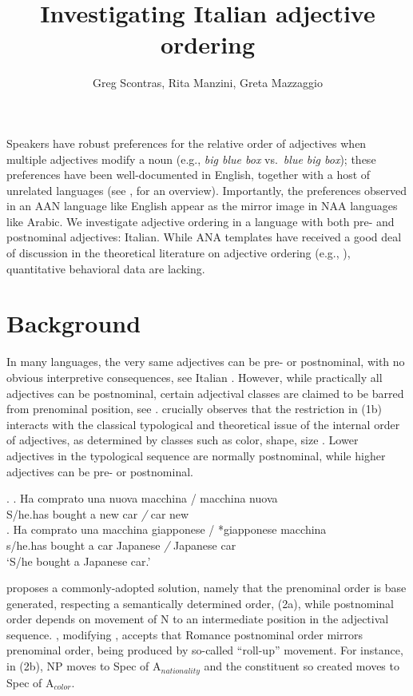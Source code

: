 \documentclass[11pt]{article}
\title{Investigating Italian adjective ordering}
\author{Greg Scontras, Rita Manzini, Greta Mazzaggio}
\begin{document}
	
\maketitle
		
		
Speakers have robust preferences for the relative order of adjectives when multiple adjectives modify a noun (e.g., \emph{big blue box} vs.~\emph{blue big box}); these preferences have been well-documented in English, together with a host of unrelated languages (see \citealp{scontras2023}, for an overview). Importantly, the preferences observed in an AAN language like English appear as the mirror image in NAA languages like Arabic. We investigate adjective ordering in a language with both pre- and postnominal adjectives: Italian. While ANA templates have received a good deal of discussion in the theoretical literature on adjective ordering (e.g., \citealp{cinque1994,cinque2010}), quantitative behavioral data are lacking. 		
		
\section{Background}

In many languages, the very same adjectives can be pre- or postnominal, with no obvious interpretive consequences, see Italian \Next[a]. However, while practically all adjectives can be postnominal, certain adjectival classes are claimed to be barred from prenominal position, see \Next[b] \citep{giorgilongobardi1991, cinque1994}. \cite{cinque1994} crucially observes that the restriction in (1b) interacts with the classical typological and theoretical issue of the internal order of adjectives, as determined by classes such as color, shape, size \citep{sproatshih1991}. Lower adjectives in the typological sequence are normally postnominal, while higher adjectives can be pre- or postnominal.         

\ex. \ag.	Ha          comprato una nuova macchina / macchina nuova\\
S/he.has bought      a     new   car           \emph{/} car           new\\
\bg.     	Ha         comprato una   macchina giapponese / *giapponese macchina\\
s/he.has bought     a    	car   	    Japanese    \emph{/} Japanese      car\\
`S/he bought a Japanese car.'


\cite{cinque1994,cinque2010} proposes a commonly-adopted solution, namely that the prenominal order is base generated, respecting a semantically determined order, (2a), while postnominal order depends on movement of N to an intermediate position in the adjectival sequence.  \cite{cinque2010}, modifying \cite{cinque1994}, accepts that Romance postnominal order mirrors prenominal order, being produced by so-called ``roll-up'' movement. For instance, in (2b), NP moves to Spec of A$_{nationality}$ and the constituent so created moves to Spec of A$_{color}$.
\end{document}
